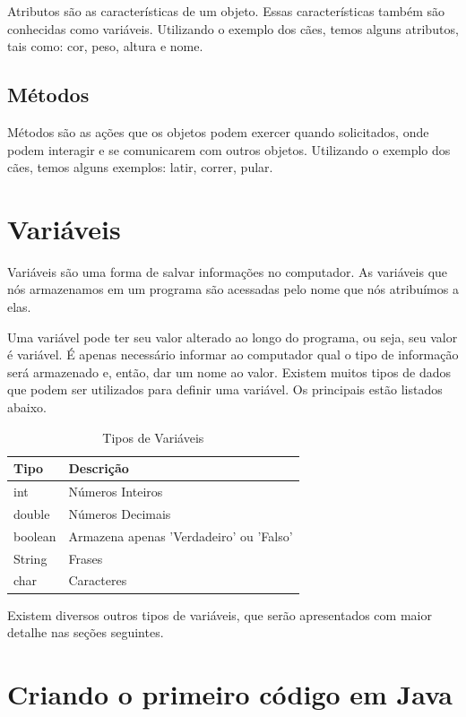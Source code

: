 \documentclass[
]{book}
\begin{document}
Atributos são as características de um objeto. Essas características também são conhecidas como variáveis. Utilizando o exemplo dos cães, temos alguns atributos, tais como: cor, peso, altura e nome.

\hypertarget{muxe9todos}{%
\subsection{Métodos}\label{muxe9todos}}

Métodos são as ações que os objetos podem exercer quando solicitados, onde podem interagir e se comunicarem com outros objetos. Utilizando o exemplo dos cães, temos alguns exemplos: latir, correr, pular.

\hypertarget{variuxe1veis}{%
\section{Variáveis}\label{variuxe1veis}}

Variáveis são uma forma de salvar informações no computador. As variáveis que nós armazenamos em um programa são acessadas pelo nome que nós atribuímos a elas.

Uma variável pode ter seu valor alterado ao longo do programa, ou seja, seu valor é variável. É apenas necessário informar ao computador qual o tipo de informação será armazenado e, então, dar um nome ao valor. Existem muitos tipos de dados que podem ser utilizados para definir uma variável. Os principais estão listados abaixo.

\begin{table}

\caption{\label{tab:unnamed-chunk-1}Tipos de Variáveis}
\centering
\begin{tabular}[t]{l|l}
\hline
Tipo & Descrição\\
\hline
int & Números Inteiros\\
\hline
double & Números Decimais\\
\hline
boolean & Armazena apenas 'Verdadeiro' ou 'Falso'\\
\hline
String & Frases\\
\hline
char & Caracteres\\
\hline
\end{tabular}
\end{table}

Existem diversos outros tipos de variáveis, que serão apresentados com maior detalhe nas seções seguintes.

\hypertarget{criando-o-primeiro-cuxf3digo-em-java}{%
\section{Criando o primeiro código em Java}\label{criando-o-primeiro-cuxf3digo-em-java}}
\end{document}
